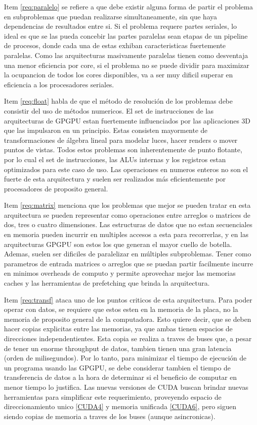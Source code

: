 Item \ref{req:paralelo} se refiere a que debe existir alguna forma de partir el problema
en subproblemas que puedan realizarse simultaneamente, sin que haya dependencias de
resultados entre si. Si el problema requere partes seriales, lo ideal es que se las
pueda concebir las partes paralelas sean etapas de un pipeline de procesos, donde
cada una de estas exhiban caracteristicas fuertemente paralelas. Como las arquitecturas
masivamente paralelas tienen como desventaja una menor eficiencia por core, si el
problema no se puede dividir para maximizar la ocupancion de todos los cores disponibles,
va a ser muy dificil superar en eficiencia a los procesadores seriales.

Item \ref{req:float} habla de que el m\'etodo de resoluci\'on de los problemas debe
consistir del uso de m\'etodos numericos. El set de instrucciones de las arquitecturas
de GPGPU estan fuertemente influenciados por las aplicaciones 3D que las impulsaron
en un principio. Estas consisten mayormente de transformaciones de \'algebra lineal
para modelar luces, hacer renders o mover puntos de vistas. Todos estos problemas
son inherentemente de punto flotante, por lo cual el set de instrucciones, las ALUs
internas y los registros estan optimizados para este caso de uso. Las operaciones
en numeros enteros no son el fuerte de esta arquitectura y suelen ser realizados
m\'as eficientemente por procesadores de proposito general.

Item \ref{req:matrix} menciona que los problemas que mejor se pueden tratar en esta
arquitectura se pueden representar como operaciones entre arreglos o matrices de
dos, tres o cuatro dimensiones. Las estructuras de datos que no estan secuenciales
en memoria pueden incurrir en multiples accesos a esta para recorrerlas, y en las
arquitecturas GPGPU son estos los que generan el mayor cuello de botella. Ademas,
suelen ser dificiles de paralelizar en m\'ultiples subproblemas. Tener como parametros de
entrada matrices o arreglos que se puedan partir facilmente incurre en minimos
overheads de computo y permite aprovechar mejor las memorias caches y las herramientas de
prefetching que brinda la arquitectura.

Item \ref{req:transf} ataca uno de los puntos criticos de esta arquitectura. Para poder
operar con datos, se requiere que estos esten en la memoria de la placa, no la memoria
de proposito general de la computadora. Esto quiere decir, que se deben hacer copias
explicitas entre las memorias, ya que ambas tienen espacios de direcciones independentientes.
Esta copia se realiza a traves de buses que, a pesar de tener un enorme throughput de
datos, tambien tienen una gran latencia (orden de milisegundos). Por lo tanto, para minimizar
el tiempo de ejecuci\'on de un programa usando las GPGPU, se debe considerar tambien el
tiempo de transferencia de datos a la hora de determinar si el beneficio de computar en
menor tiempo lo justifica. Las nuevas versiones de CUDA buscan brindar nuevas herramientas
para simplificar este requerimiento, proveyendo espacio de direccionamiento unico \ref{CUDA4} y
memoria unificada \ref{CUDA6}, pero siguen siendo copias de memoria a traves de los
buses (aunque asincronicas).

